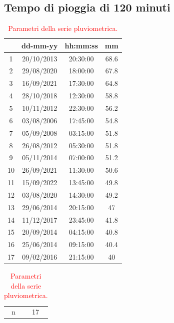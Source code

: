 \subsection{Tempo di pioggia di 120 minuti}

\begin{table}[H]
    \begin{minipage}{.5\linewidth}
      \caption{\textcolor{red}{Campione della serie pluviometrica.}}
      \centering
        \begin{tabular}{cccc}
            \toprule
            & dd-mm-yy   & hh:mm:ss & mm \\
         \midrule
         1  & 20/10/2013 & 20:30:00 & 68.6 \\
         2  & 29/08/2020 & 18:00:00 & 67.8 \\
         3  & 16/09/2021 & 17:30:00 & 64.8 \\
         4  & 28/10/2018 & 12:30:00 & 58.8 \\
         5  & 10/11/2012 & 22:30:00 & 56.2 \\
         6  & 03/08/2006 & 17:45:00 & 54.8 \\
         7  & 05/09/2008 & 03:15:00 & 51.8 \\
         8  & 26/08/2012 & 05:30:00 & 51.8 \\
         9  & 05/11/2014 & 07:00:00 & 51.2 \\
         10 & 26/09/2021 & 11:30:00 & 50.6 \\
         11 & 15/09/2022 & 13:45:00 & 49.8 \\
         12 & 03/08/2020 & 14:30:00 & 49.2 \\
         13 & 29/06/2014 & 20:15:00 & 47   \\
         14 & 11/12/2017 & 23:45:00 & 41.8 \\
         15 & 20/09/2014 & 04:15:00 & 40.8 \\
         16 & 25/06/2014 & 09:15:00 & 40.4 \\
         17 & 09/02/2016 & 21:15:00 & 40   \\
         \bottomrule  
        \end{tabular}
    \end{minipage}%
    \begin{minipage}{.5\linewidth}
      \centering
        \caption{\textcolor{red}{Parametri della serie pluviometrica.}}
        \begin{tabular}{cc}
            \toprule
            n        &     17    \\

\end{tabular}
\end{minipage}
\end{table}
